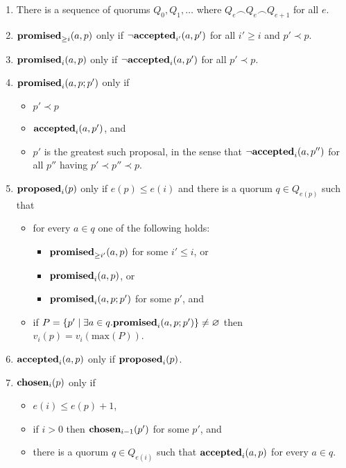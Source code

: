 \documentclass[journal]{IEEEtran}
\begin{document}
\begin{enumerate}

\item\label{paxos-quorums} There is a sequence of quorums $Q_0, Q_1, \ldots$
where ${Q_e \frown Q_e \frown Q_{e+1}}$ for all $e$.

\item\label{paxos-mprom} $\mathbf{promised}_{\ge i}(a,p)$ only if $\neg\mathbf{accepted}_{i'}(a,p')$ for all
$i' \ge i$ and $p' \prec p$.

\item\label{paxos-fprom} $\mathbf{promised}_{i}(a,p)$ only if $\neg\mathbf{accepted}_{i}(a,p')$ for all
$p' \prec p$.

\item\label{paxos-bprom} $\mathbf{promised}_{i}(a,p;p')$ only if \begin{itemize} \item
$p' \prec p$ \item $\mathbf{accepted}_{i}(a,p')$, and \item $p'$ is the greatest such
proposal, in the sense that $\neg \mathbf{accepted}_{i}(a,p'')$ for all $p''$ having $p'
\prec p'' \prec p$. \end{itemize}

\item\label{paxos-prop} $\mathbf{proposed}_{i}(p)$ only if $e(p) \le e(i)$ and there is a
quorum $q \in Q_{e(p)}$ such that
\begin{itemize}
\item for every $a \in q$ one of the following holds:
%
\begin{itemize}
\item $\mathbf{promised}_{\ge i'}(a,p)$ for some $i' \le i$, or
\item $\mathbf{promised}_{i}(a,p)$, or
\item $\mathbf{promised}_{i}(a,p;p')$ for some $p'$, and
\end{itemize}

\item if $P = \{ p' \mid \exists a \in q. \mathbf{promised}_{i}(a,p;p') \}
\ne \varnothing$ then $v_i(p) = v_i(\mathrm{max}(P))$.
\end{itemize}

\item \label{paxos-acc} $\mathbf{accepted}_{i}(a,p)$ only if $\mathbf{proposed}_{i}(p)$.

\item \label{paxos-chosen} $\mathbf{chosen}_{i}(p)$ only if
\begin{itemize}
\item $e(i) \le e(p) + 1$,
\item if $i > 0$ then $\mathbf{chosen}_{i-1}(p')$ for some $p'$, and
\item there is a quorum $q \in
Q_{e(i)}$ such that $\mathbf{accepted}_{i}(a,p)$ for every $a \in q$.
\end{itemize}

\end{enumerate}
\end{document}
